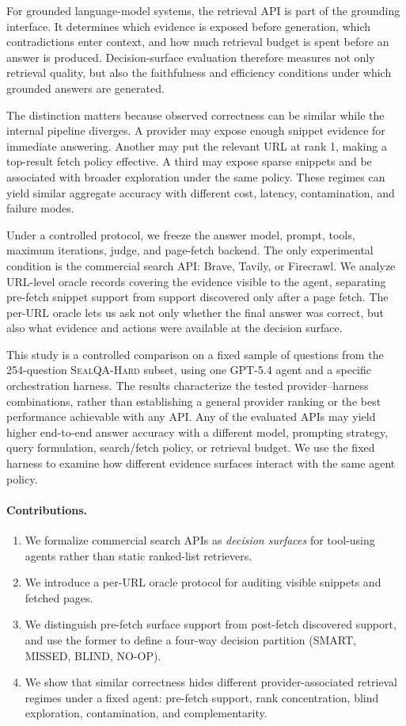 For grounded language-model systems, the retrieval API is part of the grounding interface. It determines which evidence is exposed before generation, which contradictions enter context, and how much retrieval budget is spent before an answer is produced. Decision-surface evaluation therefore measures not only retrieval quality, but also the faithfulness and efficiency conditions under which grounded answers are generated.

The distinction matters because observed correctness can be similar while the internal pipeline diverges. A provider may expose enough snippet evidence for immediate answering. Another may put the relevant URL at rank 1, making a top-result fetch policy effective. A third may expose sparse snippets and be associated with broader exploration under the same policy. These regimes can yield similar aggregate accuracy with different cost, latency, contamination, and failure modes.

Under a controlled protocol, we freeze the answer model, prompt, tools, maximum iterations, judge, and page-fetch backend. The only experimental condition is the commercial search API: Brave, Tavily, or Firecrawl. We analyze URL-level oracle records covering the evidence visible to the agent, separating pre-fetch snippet support from support discovered only after a page fetch. The per-URL oracle lets us ask not only whether the final answer was correct, but also what evidence and actions were available at the decision surface.

This study is a controlled comparison on a fixed sample of \NQueries{} questions from the 254-question \textsc{SealQA-Hard} subset, using one GPT-5.4 agent and a specific orchestration harness. The results characterize the tested provider--harness combinations, rather than establishing a general provider ranking or the best performance achievable with any API. Any of the evaluated APIs may yield higher end-to-end answer accuracy with a different model, prompting strategy, query formulation, search/fetch policy, or retrieval budget. We use the fixed harness to examine how different evidence surfaces interact with the same agent policy.

\paragraph{Contributions.}
\begin{enumerate}[leftmargin=*]
\tightlist
\item We formalize commercial search APIs as \emph{decision surfaces} for tool-using agents rather than static ranked-list retrievers.
\item We introduce a per-URL oracle protocol for auditing visible snippets and fetched pages.
\item We distinguish pre-fetch surface support from post-fetch discovered support, and use the former to define a four-way decision partition (SMART, MISSED, BLIND, NO-OP).
\item We show that similar correctness hides different provider-associated retrieval regimes under a fixed agent: pre-fetch support, rank concentration, blind exploration, contamination, and complementarity.
\end{enumerate}

